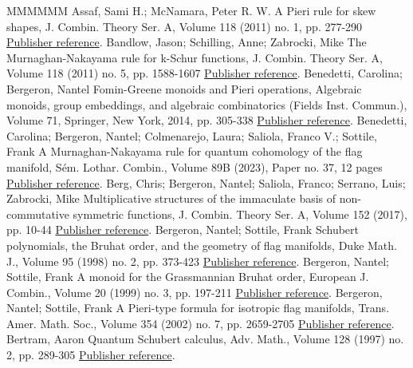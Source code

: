 \begin{thebibliography}{MMMMMM}
 Assaf, Sami H.; McNamara, Peter R. W. A Pieri rule for skew shapes, J. Combin. Theory Ser. A, Volume 118 (2011) no. 1, pp. 277-290 \href{https://alco.centre-mersenne.org/articles/10.5802/alco.427/#A-McN}{Publisher reference}.
 Bandlow, Jason; Schilling, Anne; Zabrocki, Mike The Murnaghan-Nakayama rule for k-Schur functions, J. Combin. Theory Ser. A, Volume 118 (2011) no. 5, pp. 1588-1607 \href{https://alco.centre-mersenne.org/articles/10.5802/alco.427/#BSZ11}{Publisher reference}.
 Benedetti, Carolina; Bergeron, Nantel Fomin-Greene monoids and Pieri operations, Algebraic monoids, group embeddings, and algebraic combinatorics (Fields Inst. Commun.), Volume 71, Springer, New York, 2014, pp. 305-338 \href{https://alco.centre-mersenne.org/articles/10.5802/alco.427/#Benedetti_Bergeron}{Publisher reference}.
 Benedetti, Carolina; Bergeron, Nantel; Colmenarejo, Laura; Saliola, Franco V.; Sottile, Frank A Murnaghan-Nakayama rule for quantum cohomology of the flag manifold, Sém. Lothar. Combin., Volume 89B (2023), Paper no. 37, 12 pages \href{https://alco.centre-mersenne.org/articles/10.5802/alco.427/#FPSAC23}{Publisher reference}.
 Berg, Chris; Bergeron, Nantel; Saliola, Franco; Serrano, Luis; Zabrocki, Mike Multiplicative structures of the immaculate basis of non-commutative symmetric functions, J. Combin. Theory Ser. A, Volume 152 (2017), pp. 10-44 \href{https://alco.centre-mersenne.org/articles/10.5802/alco.427/#BBSSZ}{Publisher reference}.
 Bergeron, Nantel; Sottile, Frank Schubert polynomials, the Bruhat order, and the geometry of flag manifolds, Duke Math. J., Volume 95 (1998) no. 2, pp. 373-423 \href{https://alco.centre-mersenne.org/articles/10.5802/alco.427/#BS-Bruhat}{Publisher reference}.
 Bergeron, Nantel; Sottile, Frank A monoid for the Grassmannian Bruhat order, European J. Combin., Volume 20 (1999) no. 3, pp. 197-211 \href{https://alco.centre-mersenne.org/articles/10.5802/alco.427/#BS-Monoid}{Publisher reference}.
 Bergeron, Nantel; Sottile, Frank A Pieri-type formula for isotropic flag manifolds, Trans. Amer. Math. Soc., Volume 354 (2002) no. 7, pp. 2659-2705 \href{https://alco.centre-mersenne.org/articles/10.5802/alco.427/#BS-iso}{Publisher reference}.
 Bertram, Aaron Quantum Schubert calculus, Adv. Math., Volume 128 (1997) no. 2, pp. 289-305 \href{https://alco.centre-mersenne.org/articles/10.5802/alco.427/#Bertram}{Publisher reference}.

\end{thebibliography}
